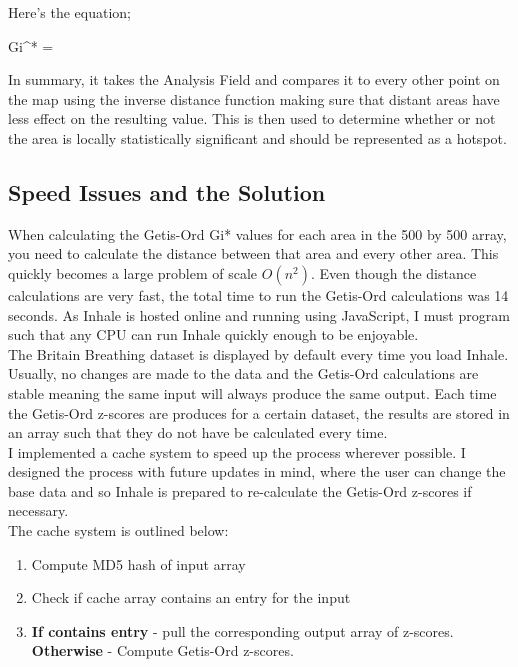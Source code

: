 Here's the equation;

\begin{myequation}%
Gi^* = 
\end{myequation}

In summary, it takes the Analysis Field and compares it to every other point on the map using the inverse distance function making sure that distant areas have less effect on the resulting value. This is then used to determine whether or not the area is locally statistically significant and should be represented as a hotspot.

\subsection{Speed Issues and the Solution}

When calculating the Getis-Ord Gi* values for each area in the 500 by 500 array, you need to calculate the distance between that area and every other area. This quickly becomes a large problem of scale $O(n^2)$. Even though the distance calculations are very fast, the total time to run the Getis-Ord calculations was 14 seconds. As Inhale is hosted online and running using JavaScript, I must program such that any CPU can run Inhale quickly enough to be enjoyable.\\

The Britain Breathing dataset is displayed by default every time you load Inhale. Usually, no changes are made to the data and the Getis-Ord calculations are stable meaning the same input will always produce the same output. Each time the Getis-Ord z-scores are produces for a certain dataset, the results are stored in an array such that they do not have be calculated every time.\\

I implemented a cache system to speed up the process wherever possible. I designed the process with future updates in mind, where the user can change the base data and so Inhale is prepared to re-calculate the Getis-Ord z-scores if necessary.\\

The cache system is outlined below:\\

\begin{enumerate}
    \item Compute MD5 hash of input array
    \item Check if cache array contains an entry for the input
    \item \textbf{If contains entry} - pull the corresponding output array of z-scores. \textbf{Otherwise} - Compute Getis-Ord z-scores.
\end{enumerate}

